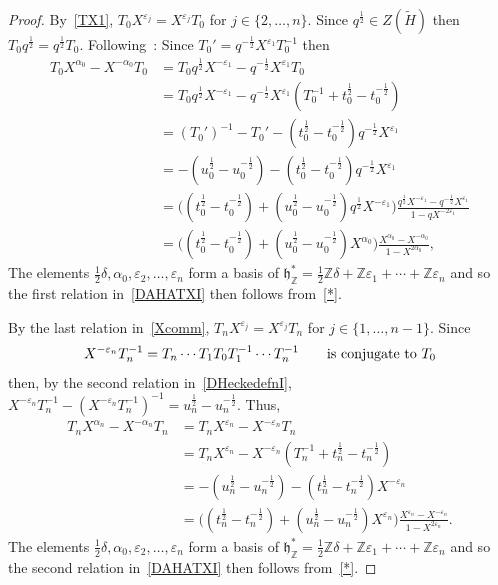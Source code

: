 \documentclass[11pt]{article}
\theoremstyle{plain}
\theoremstyle{definition}
\theoremstyle{remark}
\numberwithin{equation}{section}
\def\ZZ{\mathbb{Z}}
\def\fh{\mathfrak{h}}
\newcounter{r}
\newcounter{s}
\begin{document}
\begin{proof}
By~\eqref{TX1}, $T_0X^{\varepsilon_j} = X^{\varepsilon_j}T_0$
for $j\in \{2, \dots, n\}$.  Since $q^{\frac12}\in Z(\tilde H)$ then $T_0 q^{\frac12} = q^{\frac12}T_0$.
Following~\cite[p.\,81]{Mac03}:
Since $T_0' = q^{-\frac12}X^{\varepsilon_1}T_0^{-1}$ then
\begin{align*}
T_0X^{\alpha_0} - X^{-\alpha_0}T_0 
&= T_0q^{\frac12}X^{-\varepsilon_1}-q^{-\frac12}X^{\varepsilon_1}T_0 \\
&= T_0q^{\frac12}X^{-\varepsilon_1}-q^{-\frac12}X^{\varepsilon_1}(T_0^{-1}+t_0^{\frac12}-t_0^{-\frac12}) \\
&= (T_0')^{-1}-T_0'-(t_0^{\frac12}-t_0^{-\frac12})q^{-\frac12}X^{\varepsilon_1} \\
&= -(u_0^{\frac12} - u_0^{-\frac12})-(t_0^{\frac12}-t_0^{-\frac12})q^{-\frac12}X^{\varepsilon_1} \\
&= \big((t_0^{\frac12}-t_0^{-\frac12})+(u_0^{\frac12}-u_0^{-\frac12})q^{\frac12}X^{-\varepsilon_1}\big)
\frac{q^{\frac12}X^{-\varepsilon_1}-q^{-\frac12}X^{\varepsilon_1}}{1-qX^{-2\varepsilon_1}} \\
&= \big((t_0^{\frac12}-t_0^{-\frac12})+(u_0^{\frac12}-u_0^{-\frac12})X^{\alpha_0}\big)
\frac{X^{\alpha_0}-X^{-\alpha_0}}{1-X^{2\alpha_0}},
\end{align*}
The elements $\frac12\delta, \alpha_0, \varepsilon_2, \ldots, \varepsilon_n$
form a basis of $\fh_\ZZ^* = \frac12 \ZZ\delta+\ZZ\varepsilon_1+\cdots+\ZZ\varepsilon_n$
and so the first relation in~\eqref{DAHATXI} then follows from~\eqref{*}.


By the last relation in~\eqref{Xcomm}, $T_nX^{\varepsilon_j} = X^{\varepsilon_j} T_n$
for $j\in \{1, \ldots, n-1\}$.
Since
$$X^{-\varepsilon_n}T_n^{-1} = T_n\cdots T_1 T_0 T_1^{-1}\cdots T_n^{-1}
\qquad\hbox{is conjugate to $T_0$}
$$
then, by the second relation in~\eqref{DHeckedefnI},
$X^{-\varepsilon_n}T_n^{-1} 
- (X^{-\varepsilon_n}T_n^{-1})^{-1} = u_n^{\frac12}-u_n^{-\frac12}.$
Thus,
\begin{align*}
T_nX^{\alpha_n} - X^{-\alpha_n}T_n 
&= T_nX^{\varepsilon_n}-X^{-\varepsilon_n}T_n \\
&= T_nX^{\varepsilon_n}-X^{-\varepsilon_n}(T_n^{-1}+t_n^{\frac12}-t_n^{-\frac12}) \\
&= -(u_n^{\frac12} - u_n^{-\frac12})-(t_n^{\frac12}-t_n^{-\frac12})X^{-\varepsilon_n} \\
&= \big((t_n^{\frac12}-t_n^{-\frac12})+(u_n^{\frac12}-u_n^{-\frac12})X^{\varepsilon_n}\big)
\frac{X^{\varepsilon_n}-X^{-\varepsilon_n}}{1-X^{2\varepsilon_n}}.
\end{align*}
The elements $\frac12\delta, \alpha_0, \varepsilon_2, \ldots, \varepsilon_n$
form a basis of $\fh_\ZZ^* = \frac12 \ZZ\delta+\ZZ\varepsilon_1+\cdots+\ZZ\varepsilon_n$
and so the second relation in~\eqref{DAHATXI} then follows from~\eqref{*}.


\end{proof}
\end{document}
